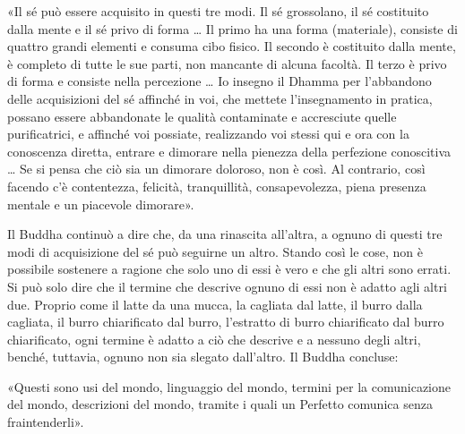 
«Il sé può essere acquisito in questi tre modi. Il sé grossolano, il sé
costituito dalla mente e il sé privo di forma … Il primo ha una forma
(materiale), consiste di quattro grandi elementi e consuma cibo fisico. Il
secondo è costituito dalla mente, è completo di tutte le sue parti, non mancante
di alcuna facoltà. Il terzo è privo di forma e consiste nella percezione … Io
insegno il Dhamma per l’abbandono delle acquisizioni del sé affinché in voi, che
mettete l’insegnamento in pratica, possano essere abbandonate le qualità
contaminate e accresciute quelle purificatrici, e affinché voi possiate,
realizzando voi stessi qui e ora con la conoscenza diretta, entrare e dimorare
nella pienezza della perfezione conoscitiva … Se si pensa che ciò sia un
dimorare doloroso, non è così. Al contrario, così facendo c’è contentezza,
felicità, tranquillità, consapevolezza, piena presenza mentale e un piacevole
dimorare».

 Il Buddha continuò a dire che, da una rinascita
all’altra, a ognuno di questi tre modi di acquisizione del sé può seguirne un
altro. Stando così le cose, non è possibile sostenere a ragione che solo uno di
essi è vero e che gli altri sono errati. Si può solo dire che il termine che
descrive ognuno di essi non è adatto agli altri due. Proprio come il latte da
una mucca, la cagliata dal latte, il burro dalla cagliata, il burro chiarificato
dal burro, l’estratto di burro chiarificato dal burro chiarificato, ogni termine
è adatto a ciò che descrive e a nessuno degli altri, benché, tuttavia, ognuno
non sia slegato dall’altro. Il Buddha concluse:

 «Questi sono usi del mondo, linguaggio del mondo, termini
per la comunicazione del mondo, descrizioni del mondo, tramite i quali un
Perfetto comunica senza fraintenderli».


